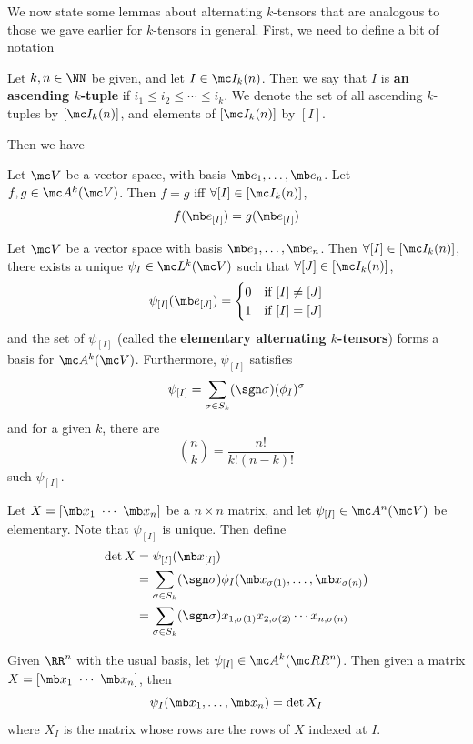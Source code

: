 \documentclass{fkbook}
\theoremstyle{snazzydefinition}
\begin{document}
  We now state some lemmas about alternating $k$-tensors that are
  analogous to those we gave earlier for $k$-tensors in general.
  First, we need to define a bit of notation
  \begin{definition}
    Let $k,n \in \NN$ be given, and let $I \in \mc I_k(n)$. Then we
    say that $I$ is \textbf{an ascending $k$-tuple} if $i_1 \leq i_2
    \leq \cdots \leq i_k$. We denote the set of all ascending
    $k$-tuples by $[\mc I_k(n)]$, and elements of $[\mc I_k(n)]$ by
    $[I]$.
  \end{definition}
  Then we have
  \begin{lemma}
    Let $\mc V$ be a vector space, with basis $\mb e_1, \ldots, \mb
    e_n$. Let $f,g \in \mc A^k(\mc V)$. Then $f = g$ iff $\forall [I]
    \in [\mc I_k(n)]$,
    \[
      f(\mb e_{[I]}) = g(\mb e_{[I]})
    \]
  \end{lemma}
  \begin{theorem}
    Let $\mc V$ be a vector space with basis $\mb e_1, \ldots, \mb
    e_n$. Then $\forall [I] \in [\mc I_k(n)]$, there exists a unique
    $\psi_I \in \mc L^k(\mc V)$ such that $\forall [J] \in [\mc
    I_k(n)]$,
    \[
      \psi_{[I]}(\mb e_{[J]}) =
      \begin{cases}
        0 & \text{if } [I] \neq [J] \\
        1 & \text{if } [I] = [J]
      \end{cases}
    \]
    and the set of $\psi_{[I]}$ (called the \textbf{elementary
      alternating $k$-tensors}) forms a basis for $\mc A^k(\mc V)$.
    Furthermore, $\psi_{[I]}$ satisfies
    \[
      \psi_{[I]} = \sum_{\sigma \in S_k} (\sgn \sigma) (\phi_I)^\sigma
    \]
    and for a given $k$, there are
    \[
      {n \choose k} = \frac{n!}{k!(n-k)!}
    \]
    such $\psi_{[I]}$.
  \end{theorem}
  \begin{definition}[Determinant]
    Let $X = [\mb x_1\ \cdots\ \mb x_n]$ be a $n\times n$ matrix, and
    let $\psi_{[I]} \in \mc A^n(\mc V)$ be elementary. Note that
    $\psi_{[I]}$ is unique. Then define
    \begin{align*}
      \det X
      &= \psi_{[I]} (\mb x_{[I]}) \\
      &= \sum_{\sigma \in S_k} (\sgn \sigma) \phi_I(\mb x_{\sigma(1)},
        \ldots, \mb x_{\sigma(n)}) \\
      &= \sum_{\sigma \in S_k} (\sgn \sigma) x_{1,\sigma(1)}
        x_{2,\sigma(2)} \cdots x_{n,\sigma(n)}
    \end{align*}
  \end{definition}
  \begin{corollary}
    Given $\RR^n$ with the usual basis, let $\psi_{[I]} \in \mc
    A^k(\mc RR^n)$. Then given a matrix $X = [\mb x_1\ \cdots\ \mb
    x_n]$, then
    \[
      \psi_I(\mb x_1, \ldots, \mb x_n) = \det X_I
    \]
    where $X_I$ is the matrix whose rows are the rows of $X$ indexed
    at $I$.
  \end{corollary}
\end{document}
